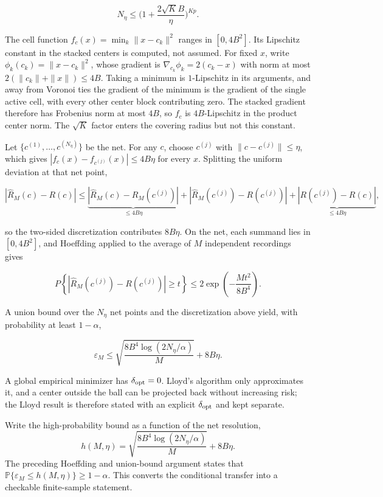 \[N_\eta\le\Big(1+\frac{2\sqrt K B}{\eta}\Big)^{Kp}.\]

The cell function \(f_c(x)=\min_k\|x-c_k\|^2\) ranges in \([0,4B^2]\).
Its Lipschitz constant in the stacked centers is computed, not assumed.
For fixed \(x\), write \(\phi_k(c_k)=\|x-c_k\|^2\), whose gradient is
\(\nabla_{c_k}\phi_k=2(c_k-x)\) with norm at most
\(2(\|c_k\|+\|x\|)\le 4B\). Taking a minimum is \(1\)-Lipschitz in its
arguments, and away from Voronoi ties the gradient of the minimum is the
gradient of the single active cell, with every other center block
contributing zero. The stacked gradient therefore has Frobenius norm at
most \(4B\), so \(f_c\) is \(4B\)-Lipschitz in the product center norm.
The \(\sqrt K\) factor enters the covering radius but not this constant.

Let \(\{c^{(1)},\dots,c^{(N_\eta)}\}\) be the net. For any \(c\), choose
\(c^{(j)}\) with \(\|c-c^{(j)}\|\le\eta\), which gives
\(|f_c(x)-f_{c^{(j)}}(x)|\le 4B\eta\) for every \(x\). Splitting the
uniform deviation at that net point,

\[|\widehat R_M(c)-R(c)|\le
\underbrace{|\widehat R_M(c)-\widehat R_M(c^{(j)})|}_{\le 4B\eta}
+|\widehat R_M(c^{(j)})-R(c^{(j)})|
+\underbrace{|R(c^{(j)})-R(c)|}_{\le 4B\eta},\]

so the two-sided discretization contributes \(8B\eta\). On the net, each
summand lies in \([0,4B^2]\), and Hoeffding applied to the average of
\(M\) independent recordings gives

\[P\!\left\{|\widehat R_M(c^{(j)})-R(c^{(j)})|\ge t\right\}
\le 2\exp\!\left(-\frac{M t^2}{8B^4}\right).\]

A union bound over the \(N_\eta\) net points and the discretization
above yield, with probability at least \(1-\alpha\),

\[\varepsilon_M\le\sqrt{\frac{8B^4\log(2N_\eta/\alpha)}{M}}+8B\eta.\]

A global empirical minimizer has \(\delta_{\rm opt}=0\). Lloyd's
algorithm only approximates it, and a center outside the ball can be
projected back without increasing risk; the Lloyd result is therefore
stated with an explicit \(\delta_{\rm opt}\) and kept separate.

Write the high-probability bound as a function of the net resolution,
\[h(M,\eta)=\sqrt{\frac{8B^4\log(2N_\eta/\alpha)}{M}}+8B\eta.\] The
preceding Hoeffding and union-bound argument states that
\(\mathbb P\{\varepsilon_M\le h(M,\eta)\}\ge1-\alpha\). This converts
the conditional transfer into a checkable finite-sample statement.

